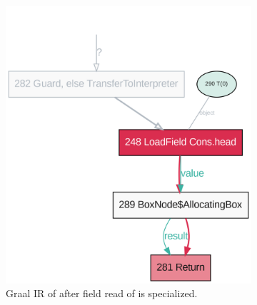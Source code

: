 \begin{figure}[!htb]
	\centering
	\begin{subfigure}[b]{0.4\textwidth}
		\centering
		\includegraphics[width=\textwidth]{figures/dot/List.head.specialized.TruffleTier.png}
		\caption{Graal IR of  after field read of  is specialized.}
		\label{graalir:cons-head-specialized}
	\end{subfigure}
	\hfill
	\begin{subfigure}[b]{0.4\textwidth}
		\centering

\end{subfigure}
\end{figure}
